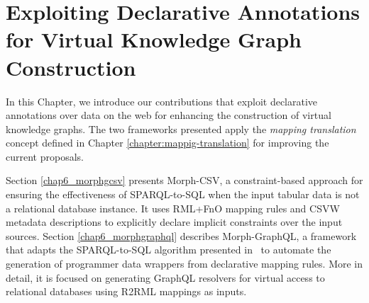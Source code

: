 
\chapter{Exploiting Declarative Annotations for Virtual Knowledge Graph Construction}
\label{chapter:virtual}

In this Chapter, we introduce our contributions that exploit declarative annotations over data on the web for enhancing the construction of virtual knowledge graphs. The two frameworks presented apply the \textit{mapping translation} concept defined in Chapter \ref{chapter:mappig-translation} for improving the current proposals. 

Section \ref{chap6_morphgcsv} presents Morph-CSV, a constraint-based approach for ensuring the effectiveness of SPARQL-to-SQL when the input tabular data is not a relational database instance. It uses RML+FnO mapping rules and CSVW metadata descriptions to explicitly declare implicit constraints over the input sources. Section \ref{chap6_morphgraphql} describes Morph-GraphQL, a framework that adapts the SPARQL-to-SQL algorithm presented in~\citep{chebotko2009semantics} to automate the generation of programmer data wrappers from declarative mapping rules. More in detail, it is focused on generating GraphQL resolvers for virtual access to relational databases using R2RML mappings as inputs.



